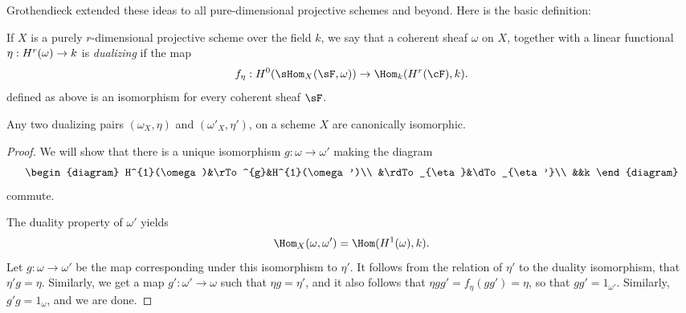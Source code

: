 %

Grothendieck extended these ideas to all pure-dimensional projective schemes and beyond. Here is the basic definition:

\begin{definition}
If $X$ is a purely $r$-dimensional projective scheme over the field $k$, we say that a coherent sheaf $\omega$ on $X$, together with a linear
functional $\eta:{H}^{r}(\omega) \to k$ is \emph{dualizing} if the map
$$
f_{\eta}: \HH^{0}(\sHom_{X}(\sF, \omega))
\to
\Hom_{k}(\HH^{r}(\cF), k).
$$
defined as above is an isomorphism for every coherent sheaf $\sF$.
\end{definition}

\begin{proposition} Any two dualizing pairs $(\omega_{X}, \eta)$ and $(\omega'_{X}, \eta')$, on a scheme $X$ are canonically isomorphic.
\end{proposition}

\begin{proof}
We will show that there is a unique isomorphism $g: \omega\to \omega'$ making the diagram
$$
\begin{diagram}
 H^{1}(\omega)&\rTo^{g}&H^{1}(\omega')\\
 &\rdTo_{\eta}&\dTo_{\eta'}\\
 &&k
\end{diagram}
$$
commute. 

 The duality property of $\omega'$ yields
$$
\Hom_{X}(\omega, \omega')  = \Hom(\HH^{1}(\omega), k).
$$
Let $g: \omega \to \omega'$ be the map corresponding under this isomorphism to $\eta'$. It follows from the relation of $\eta'$ to the duality isomorphism, that 
$\eta'g = \eta$. Similarly, we get a map $g':\omega'\to \omega$ such that
$\eta g = \eta'$, and it also follows that $\eta gg' = f_{\eta}(gg') =  \eta$, so that
$gg' = 1_{\omega'}$. Similarly, $g'g = 1_{\omega}$, and we are done.
\end{proof}
 

